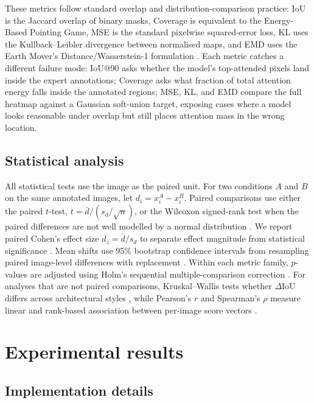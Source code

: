\documentclass[lineno,pdflatex,sn-mathphys-num]{sn-jnl}%
\theoremstyle{thmstyleone}%
\theoremstyle{thmstyletwo}%
\theoremstyle{thmstylethree}%
\begin{document}
These metrics follow standard overlap and distribution-comparison practice: IoU is the Jaccard overlap of binary masks, Coverage is equivalent to the Energy-Based Pointing Game, MSE is the standard pixelwise squared-error loss, KL uses the Kullback--Leibler divergence between normalised maps, and EMD uses the Earth Mover's Distance/Wasserstein-1 formulation \cite{Jaccard1912,Petsiuk2021,Kullback1951,Rubner2000}. Each metric catches a different failure mode: IoU@90 asks whether the model's top-attended pixels land inside the expert annotations; Coverage asks what fraction of total attention energy falls inside the annotated regions; MSE, KL, and EMD compare the full heatmap against a Gaussian soft-union target, exposing cases where a model looks reasonable under overlap but still places attention mass in the wrong location.

\subsection{Statistical analysis} All statistical tests use the image as the paired unit. For two conditions $A$ and $B$ on the same annotated images, let $d_i=x_i^A-x_i^B$. Paired comparisons use either the paired $t$-test, $t=\bar d/(s_d/\sqrt n)$, or the Wilcoxon signed-rank test when the paired differences are not well modelled by a normal distribution \cite{Student1908,Wilcoxon1945}. We report paired Cohen's effect size $d_z=\bar d/s_d$ to separate effect magnitude from statistical significance \cite{Cohen1988,Lakens2013}. Mean shifts use 95\% bootstrap confidence intervals from resampling paired image-level differences with replacement \cite{Efron1993}. Within each metric family, $p$-values are adjusted using Holm's sequential multiple-comparison correction \cite{Holm1979}. For analyses that are not paired comparisons, Kruskal--Wallis tests whether $\Delta$IoU differs across architectural styles \cite{Kruskal1952}, while Pearson's $r$ and Spearman's $\rho$ measure linear and rank-based association between per-image score vectors \cite{Pearson1895,Spearman1904}.
 

\section{Experimental results} \label{section results}

\subsection{Implementation details}
\end{document}
